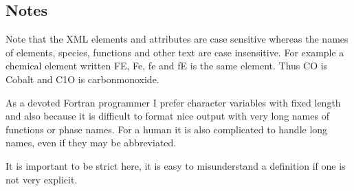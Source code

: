 \documentclass{article}
\begin{document}

\newpage 

\subsection{Notes}\label{sec:notes}

Note that the XML elements and attributes are case sensitive whereas
the names of elements, species, functions and other text are case
insensitive.  For example a chemical element written FE, Fe, fe and fE
is the same element.  Thus CO is Cobalt and C1O is carbonmonoxide.

As a devoted Fortran programmer I prefer character variables with
fixed length and also because it is difficult to format nice output
with very long names of functions or phase names.  For a human it is
also complicated to handle long names, even if they may be
abbreviated.

It is important to be strict here, it is easy to misunderstand a
definition if one is not very explicit.
\end{document}
